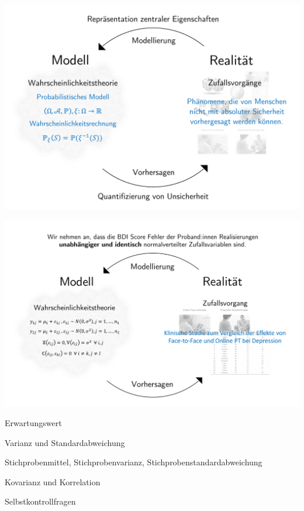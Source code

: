 \documentclass[
  8pt,
  ignorenonframetext,
]{beamer}
\begin{document}
\begin{frame}{}
\protect\hypertarget{section-3}{}
\begin{center}\includegraphics[width=0.85\linewidth]{6_Abbildungen/wtfi_6_wahrscheinlichkeitstheorie_modell} \end{center}
\end{frame}

\begin{frame}{}
\protect\hypertarget{section-4}{}
\begin{center}\includegraphics[width=1\linewidth]{6_Abbildungen/wtfi_6_wahrscheinlichkeitstheorie_modell_beispiel} \end{center}
\end{frame}

\begin{frame}{}
\protect\hypertarget{section-5}{}
\large
\vfill

Erwartungswert

Varianz und Standardabweichung

Stichprobenmittel, Stichprobenvarianz, Stichprobenstandardabweichung

Kovarianz und Korrelation

Selbstkontrollfragen \vfill
\end{frame}
\end{document}
